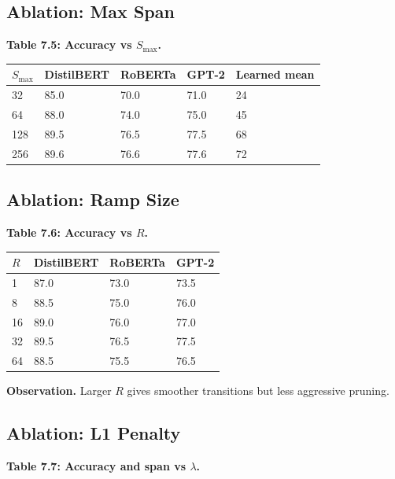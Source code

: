 \subsection{Ablation: Max Span}

\textbf{Table 7.5: Accuracy vs $S_\text{max}$.}

\begin{table}[H]
\centering
\small
\begin{tabular}{lllll}
\toprule
\textbf{$S_\text{max}$} & \textbf{DistilBERT} & \textbf{RoBERTa} & \textbf{GPT-2} & \textbf{Learned mean} \\
\midrule
32 & 85.0 & 70.0 & 71.0 & 24 \\
64 & 88.0 & 74.0 & 75.0 & 45 \\
128 & 89.5 & 76.5 & 77.5 & 68 \\
256 & 89.6 & 76.6 & 77.6 & 72 \\
\bottomrule
\end{tabular}
\end{table}

\subsection{Ablation: Ramp Size}

\textbf{Table 7.6: Accuracy vs $R$.}

\begin{table}[H]
\centering
\small
\begin{tabular}{llll}
\toprule
\textbf{$R$} & \textbf{DistilBERT} & \textbf{RoBERTa} & \textbf{GPT-2} \\
\midrule
1 & 87.0 & 73.0 & 73.5 \\
8 & 88.5 & 75.0 & 76.0 \\
16 & 89.0 & 76.0 & 77.0 \\
32 & 89.5 & 76.5 & 77.5 \\
64 & 88.5 & 75.5 & 76.5 \\
\bottomrule
\end{tabular}
\end{table}

\textbf{Observation.} Larger $R$ gives smoother transitions but less aggressive 
pruning.

\subsection{Ablation: L1 Penalty}

\textbf{Table 7.7: Accuracy and span vs $\lambda$.}

